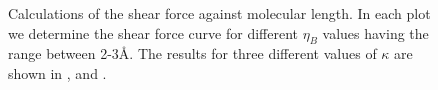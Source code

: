 \begin{figure}[H]
\begin{tabular}{cc}
\end{tabular}
\caption{Calculations of the shear force against molecular length. In each plot we determine the shear force curve for different $\eta_{B}$ values having the range between 2-3\AA.  The results for three different values of $\kappa$ are shown in ,  and .}
\label{fig:collagen_results} 
\end{figure}
